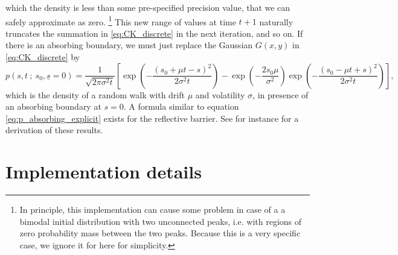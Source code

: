 \documentclass[11pt]{article}
\begin{document}
which the density is less than some pre-specified precision value, that we can safely approximate as zero. 
\footnote{
In principle, this implementation can cause some problem in case of a a bimodal initial distribution with two unconnected peaks, 
i.e. with regions of zero probability mass between the two peaks. 
Because this is a very specific case, we ignore it for here for simplicity. 
} 
This new range of values at time $t+1$ naturally truncates the summation in \eqref{eq:CK_discrete} in the next iteration, and so on. 
If there is an absorbing boundary, we must just replace the Gaussian $G(x,y)$ in \eqref{eq:CK_discrete} by 
\begin{equation}
	p(s, t ~ ; ~s_0, \underline{s}=0) = \frac{1}{\sqrt{2 \pi \sigma^2 t}} 
 							\left[
 							 \exp \left( - \frac{ ( s_0 + \mu t - s )^2 }{2 \sigma^2 t}   \right) 
 							 - \exp \left( - \frac{2 s_0 \mu}{\sigma^2} \right) 
							 \exp \left(- \frac{  ( s_0 - \mu t + s )^2 }{2 \sigma^2 t} \right) 							 
 							 \right],
							 \label{eq:p_absorbing_explicit}
\end{equation} 
which is the density of a random walk with drift $\mu$ and volatility $\sigma$, in presence of an absorbing boundary at $s = 0$. 
A formula similar to equation \eqref{eq:p_absorbing_explicit} exists for the reflective barrier. 
See for  instance \cite{Molini2011} for a derivation of these results. 


\section{Implementation details} 
\end{document}
